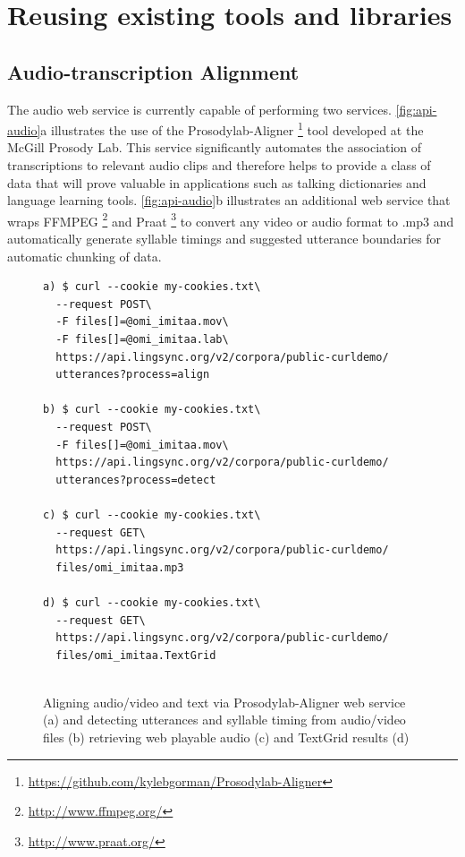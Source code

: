 \documentclass[11pt]{article}
\newcommand{\smalltodo}[2][]
    {\todo[caption={#2}, #1]
    {\tiny#2\normalsize}}
\begin{document}
\section{Reusing existing tools and libraries}
\label{sec:plugins}




\subsection{Audio-transcription Alignment}
The audio web service is currently capable of performing two services.
\autoref{fig:api-audio}a illustrates the use of the
Prosodylab-Aligner%
\footnote{\url{https://github.com/kylebgorman/Prosodylab-Aligner}} %
tool developed at the McGill Prosody Lab. This service significantly automates
the association of transcriptions to relevant audio clips and therefore helps
to provide a class of data that will prove valuable in applications such as
talking dictionaries and language learning tools. \autoref{fig:api-audio}b
illustrates an additional web service that wraps
FFMPEG%
\footnote{\url{http://www.ffmpeg.org/}} %
and Praat%
\footnote{\url{http://www.praat.org/}} %
to convert any video or audio format to .mp3 and automatically generate
syllable timings and suggested utterance boundaries for automatic chunking of
data.


\begin{figure}[h]
\scriptsize
\begin{verbatim}
a) $ curl --cookie my-cookies.txt\
  --request POST\
  -F files[]=@omi_imitaa.mov\
  -F files[]=@omi_imitaa.lab\
  https://api.lingsync.org/v2/corpora/public-curldemo/
  utterances?process=align

b) $ curl --cookie my-cookies.txt\
  --request POST\
  -F files[]=@omi_imitaa.mov\
  https://api.lingsync.org/v2/corpora/public-curldemo/
  utterances?process=detect
  
c) $ curl --cookie my-cookies.txt\
  --request GET\
  https://api.lingsync.org/v2/corpora/public-curldemo/
  files/omi_imitaa.mp3
 
d) $ curl --cookie my-cookies.txt\
  --request GET\
  https://api.lingsync.org/v2/corpora/public-curldemo/
  files/omi_imitaa.TextGrid
   
\end{verbatim}
\caption{Aligning audio/video and text via Prosodylab-Aligner web service (a) and detecting utterances and syllable timing from audio/video files (b) retrieving web playable audio (c) and TextGrid results (d)}
\normalsize
\label{fig:api-audio}
\end{figure}
\end{document}

